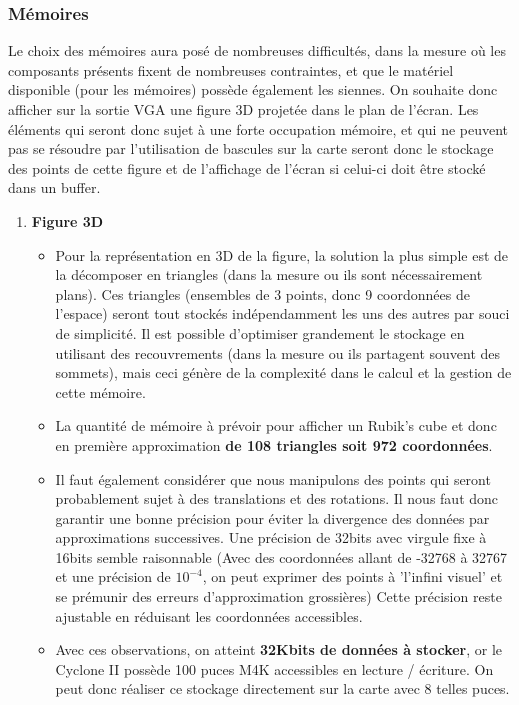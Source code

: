 \documentclass[10pt,a4paper]{article}
\begin{document}
\subsubsection{Mémoires}
Le choix des mémoires aura posé de nombreuses difficultés, dans la mesure où les composants présents fixent de nombreuses contraintes, et que le matériel disponible (pour les mémoires) possède également les siennes.
On souhaite donc afficher sur la sortie VGA une figure 3D projetée dans le plan de l'écran. Les éléments qui seront donc sujet à une forte occupation mémoire, et qui ne peuvent pas se résoudre par l'utilisation de bascules sur la carte seront donc le stockage des points de cette figure et de l'affichage de l'écran si celui-ci doit être stocké dans un buffer.

\begin{enumerate}
\item \textbf{Figure 3D}
\begin{itemize}
\item Pour la représentation en 3D de la figure, la solution la plus simple est de la décomposer en triangles (dans la mesure ou ils sont nécessairement plans). Ces triangles (ensembles de 3 points, donc 9 coordonnées de l'espace) seront tout stockés indépendamment les uns des autres par souci de simplicité. Il est possible d'optimiser grandement le stockage en utilisant des recouvrements (dans la mesure ou ils partagent souvent des sommets), mais ceci génère de la complexité dans le calcul et la gestion de cette mémoire.

\item La quantité de mémoire à prévoir pour afficher un Rubik's cube et donc en première approximation \textbf{de 108 triangles soit 972 coordonnées}. 

\item Il faut également considérer que nous manipulons des points qui seront probablement sujet à des translations et des rotations. Il nous faut donc garantir une bonne précision pour éviter la divergence des données par approximations successives. Une précision de 32bits avec virgule fixe à 16bits semble raisonnable (Avec des coordonnées allant de -32768 à 32767 et une précision de $10^{-4}$, on peut exprimer des points à 'l'infini visuel' et se prémunir des erreurs d'approximation grossières) Cette précision reste ajustable en réduisant les coordonnées accessibles. 

\item Avec ces observations, on atteint \textbf{32Kbits de données à stocker}, or le Cyclone II possède 100 puces M4K accessibles en lecture / écriture. On peut donc réaliser ce stockage directement sur la carte avec 8 telles puces.


\end{itemize}
\end{enumerate}
\end{document}
